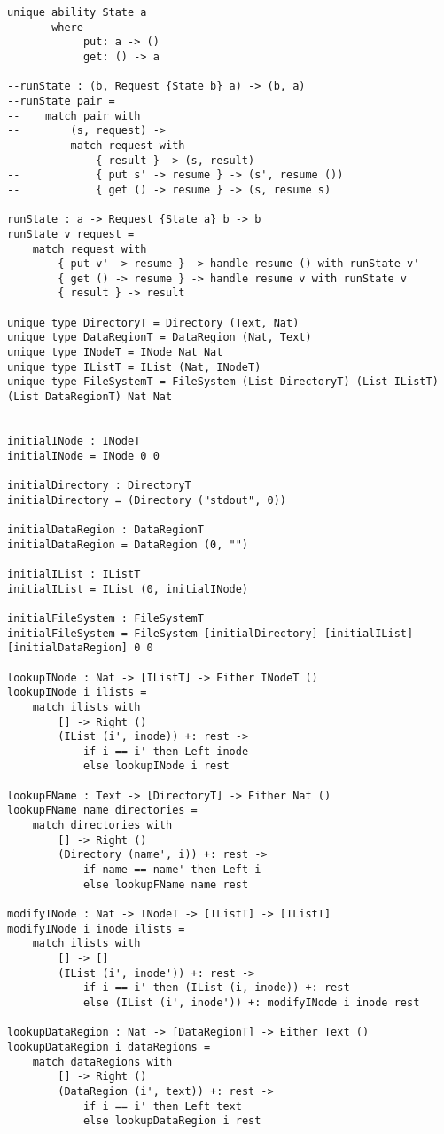 \documentclass[logo,bsc,singlespacing,parskip]{infthesis}
\begin{document}
\begin{lstlisting}[language=unison]
unique ability State a
       where
            put: a -> ()
            get: () -> a

--runState : (b, Request {State b} a) -> (b, a)
--runState pair =
--    match pair with 
--        (s, request) ->
--        match request with
--            { result } -> (s, result)
--            { put s' -> resume } -> (s', resume ())
--            { get () -> resume } -> (s, resume s)

runState : a -> Request {State a} b -> b
runState v request =
    match request with
        { put v' -> resume } -> handle resume () with runState v'
        { get () -> resume } -> handle resume v with runState v
        { result } -> result

unique type DirectoryT = Directory (Text, Nat)
unique type DataRegionT = DataRegion (Nat, Text)
unique type INodeT = INode Nat Nat
unique type IListT = IList (Nat, INodeT)
unique type FileSystemT = FileSystem (List DirectoryT) (List IListT) (List DataRegionT) Nat Nat


initialINode : INodeT
initialINode = INode 0 0

initialDirectory : DirectoryT
initialDirectory = (Directory ("stdout", 0))

initialDataRegion : DataRegionT
initialDataRegion = DataRegion (0, "")

initialIList : IListT
initialIList = IList (0, initialINode)

initialFileSystem : FileSystemT
initialFileSystem = FileSystem [initialDirectory] [initialIList] [initialDataRegion] 0 0

lookupINode : Nat -> [IListT] -> Either INodeT ()
lookupINode i ilists =
    match ilists with
        [] -> Right ()
        (IList (i', inode)) +: rest ->
            if i == i' then Left inode
            else lookupINode i rest

lookupFName : Text -> [DirectoryT] -> Either Nat ()
lookupFName name directories =
    match directories with
        [] -> Right ()
        (Directory (name', i)) +: rest ->
            if name == name' then Left i
            else lookupFName name rest

modifyINode : Nat -> INodeT -> [IListT] -> [IListT]
modifyINode i inode ilists =
    match ilists with
        [] -> []
        (IList (i', inode')) +: rest ->
            if i == i' then (IList (i, inode)) +: rest
            else (IList (i', inode')) +: modifyINode i inode rest

lookupDataRegion : Nat -> [DataRegionT] -> Either Text ()
lookupDataRegion i dataRegions =
    match dataRegions with
        [] -> Right ()
        (DataRegion (i', text)) +: rest ->
            if i == i' then Left text
            else lookupDataRegion i rest


\end{lstlisting}
\end{document}
